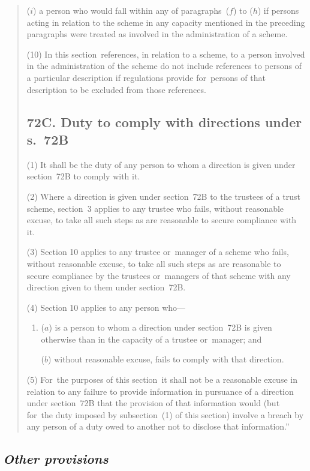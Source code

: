 \documentclass[12pt,a4paper]{article}
\begin{document}
\begin{quotation}
\begin{enumerate}
($i$) a person who would fall within any of paragraphs~($f$)  to ($h$)  if persons acting in relation to the scheme in any capacity mentioned in the preceding paragraphs were treated as involved in the administration of a scheme.
\end{enumerate}

(10) In this section~references, in relation to a scheme, to a person involved in the administration of the scheme do not include references to persons of a particular description if regulations provide for~persons of that description to be excluded from those references.

\subsection*{72C. Duty to comply with directions under s.\ 72B}

(1) It shall be the duty of any person to whom a direction is given under section~72B to comply with it.

(2) Where a direction is given under section~72B to the trustees of a trust scheme, section~3 applies to any trustee who fails, without reasonable excuse, to take all such steps as are reasonable to secure compliance with it.

(3) Section 10 applies to any trustee or~manager of a scheme who fails, without reasonable excuse, to take all such steps as are reasonable to secure compliance by the trustees or~managers of that scheme with any direction given to them under section~72B.

(4) Section 10 applies to any person who—
\begin{enumerate}\item[]
($a$) is a person to whom a direction under section~72B is given otherwise than in the capacity of a trustee or~manager; and

($b$) without reasonable excuse, fails to comply with that direction.
\end{enumerate}

(5) For~the purposes of this section~it shall not be a reasonable excuse in relation to any failure to provide information in pursuance of a direction under section~72B that the provision of that information would (but for~the duty imposed by subsection~(1)  of this section) involve a breach by any person of a duty owed to another not to disclose that information.”
\end{quotation}

\subsection{\itshape Other provisions}
\end{document}
